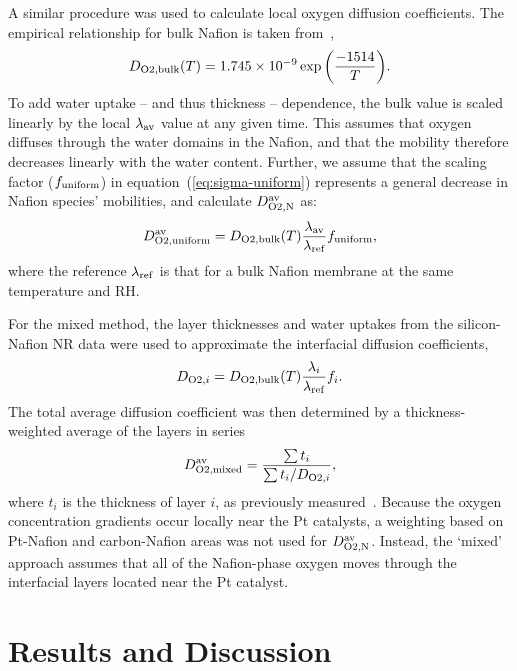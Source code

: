 \documentclass[final,3p,times,twocolumn]{elsarticle}    %
\begin{document}
A similar procedure was used to calculate local oxygen diffusion coefficients. The empirical relationship for bulk Nafion is taken from~\cite{bib:sethuraman_2009},
\begin{equation}
    D_{\rm O2, bulk}(T) = 1.745 \times 10^{-9} \exp \bigg( \frac{-1514}{T} \bigg).
\end{equation}
To add water uptake -- and thus thickness -- dependence, the bulk value is scaled linearly by the local $\lambda_{\rm av}$ value at any given time. This assumes that oxygen diffuses through the water domains in the Nafion, and that the mobility therefore decreases linearly with the water content. Further, we assume that the scaling factor ($f_{\rm uniform}$) in equation~(\ref{eq:sigma-uniform}) represents a general decrease in Nafion species' mobilities, and calculate $D_{\rm O2, N}^{\rm av}$ as:
\begin{equation}
    D_{\rm O2, uniform}^{\rm av} = D_{\rm O2, bulk}(T) \frac{\lambda_{\rm av}}{\lambda_{\rm ref}} f_{\rm uniform},
\end{equation}
where the reference $\lambda_{\rm ref}$ is that for a bulk Nafion membrane at the same temperature and RH.

For the mixed method, the layer thicknesses and water uptakes from the silicon-Nafion NR data were used to approximate the interfacial diffusion coefficients,
\begin{equation}
    D_{{\rm O2},i} = D_{\rm O2, bulk}(T) \frac{\lambda_{i}}{\lambda_{\rm ref}} f_{i}.
\end{equation}
The total average diffusion coefficient was then determined by a thickness-weighted average of the layers in series
\begin{equation}
    D_{\rm O2, mixed}^{\rm av} = \frac{\sum t_i}{\sum t_i / D_{{\rm O2},i}},
\end{equation}
where $t_i$ is the thickness of layer $i$, as previously measured~\cite{bib:decaluwe_2018}. Because the oxygen concentration gradients occur locally near the Pt catalysts, a weighting based on Pt-Nafion and carbon-Nafion areas was not used for $D_{\rm O2, N}^{\rm av}$. Instead, the `mixed' approach assumes that all of the Nafion-phase oxygen moves through the interfacial layers located near the Pt catalyst.

\section{Results and Discussion}
\end{document}
